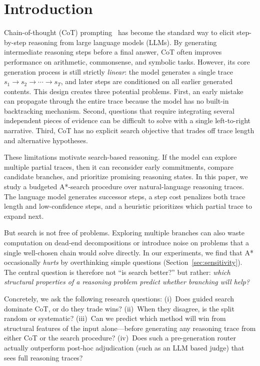 \documentclass[11pt]{article}
\begin{document}
\section{Introduction}
\label{sec:intro}

Chain-of-thought (CoT) prompting~\cite{wei2022chain} has become the standard way to elicit step-by-step reasoning from large language models (LLMs). By generating intermediate reasoning steps before a final answer, CoT often improves performance on arithmetic, commonsense, and symbolic tasks. However, its core generation process is still strictly \emph{linear}: the model generates a single trace $s_1 \rightarrow s_2 \rightarrow \cdots \rightarrow s_T$, and later steps are conditioned on all earlier generated contents. This design creates three potential problems. First, an early mistake can propagate through the entire trace because the model has no built-in backtracking mechanism. Second, questions that require integrating several independent pieces of evidence can be difficult to solve with a single left-to-right narrative. Third, CoT has no explicit search objective that trades off trace length and alternative hypotheses.

These limitations motivate search-based reasoning. If the model can explore multiple partial traces, then it can reconsider early commitments, compare candidate branches, and prioritize promising reasoning states. In this paper, we study a budgeted A*-search procedure over natural-language reasoning traces. The language model generates successor steps, a step cost penalizes both trace length and low-confidence steps, and a heuristic prioritizes which partial trace to expand next.

But search is not free of problems. Exploring multiple branches can also waste computation on dead-end decompositions or introduce noise on problems that a single well-chosen chain would solve directly. In our experiments, we find that A* occasionally \emph{hurts} by overthinking simple questions (Section~\ref{sec:sensitivity}). The central question is therefore not ``is search better?'' but rather: \emph{which structural properties of a reasoning problem predict whether branching will help?}

Concretely, we ask the following research questions: (i)~Does guided search dominate CoT, or do they trade wins? (ii)~When they disagree, is the split random or systematic? (iii)~Can we predict which method will win from structural features of the input alone---before generating any reasoning trace from either CoT or the search procedure? (iv)~Does such a pre-generation router actually outperform post-hoc adjudication (such as an LLM based judge) that sees full reasoning traces?
\end{document}
